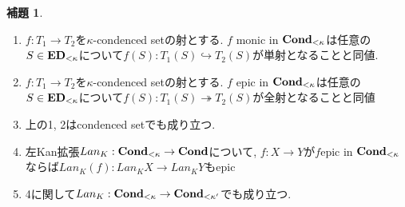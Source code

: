 \documentclass[dvipdfmx,a4paper,11pt]{article}
\theoremstyle{definition}
\newtheorem{lem}[thm]{補題}
\begin{document}
 \begin{tcolorbox}
 [colback = white, colframe = green!35!black, fonttitle = \bfseries,breakable = true]
 \begin{lem}\cite[Theorem 4.11.2, 4.11.3, 4.11.4]{Bar22}
 \label{lem-cond-epi}
 \text{}
 \begin{enumerate}
 \item $f : T_1 \to T_2$を$\kappa$-condenced setの射とする. $f$ monic in ${\bf Cond}_{<\kappa}$は任意の$S \in {\bf ED}_{<\kappa}$について$f(S) : T_1(S) \hookrightarrow T_2(S)$が単射となることと同値.
  \item $f : T_1 \to T_2$を$\kappa$-condenced setの射とする.
   $f$ epic in ${\bf Cond}_{<\kappa}$は任意の$S \in {\bf ED}_{<\kappa}$について$f(S) : T_1(S) \twoheadrightarrow T_2(S)$が全射となることと同値
  \item 上の1, 2はcondenced setでも成り立つ. 
  \item 左Kan拡張$Lan_{K} : {\bf Cond}_{<\kappa} \to {\bf Cond}$について, $f : X \to Y$が$f$epic in ${\bf Cond}_{<\kappa}$ならば$Lan_{K}(f) : Lan_{K}X \to Lan_{K}Y$もepic
  \item 4に関して$Lan_{K} : {\bf Cond}_{<\kappa} \to {\bf Cond}_{< \kappa'}$でも成り立つ. 
 \end{enumerate}
 \end{lem}
 \end{tcolorbox}
\end{document}
